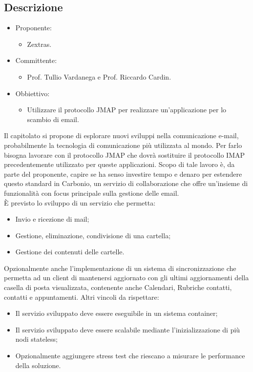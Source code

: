 \documentclass[a4paper, twoside]{article}
\begin{document}
    \subsection{Descrizione}
        \begin{itemize}
            \item Proponente:
            \begin{itemize}
                \item Zextras.
            \end{itemize}
            \item Committente:
            \begin{itemize}
                \item Prof. Tullio Vardanega e Prof.
                Riccardo Cardin.
            \end{itemize}
            \item Obbiettivo:
            \begin{itemize}
                \item Utilizzare il protocollo JMAP per realizzare un'applicazione per lo scambio di email.
            \end{itemize}
        \end{itemize}
        Il capitolato si propone di esplorare nuovi sviluppi nella comunicazione e-mail, probabilmente la tecnologia di comunicazione più utilizzata al mondo.
        Per farlo bisogna lavorare con il protocollo JMAP che dovrà sostituire il protocollo IMAP precedentemente utilizzato per queste applicazioni.
        Scopo di tale lavoro è, da parte del proponente, capire se ha senso investire tempo e denaro per estendere questo standard in Carbonio, un servizio di
        collaborazione che offre un’insieme di funzionalità con focus
        principale sulla gestione delle email.\\
        È previsto lo sviluppo di un servizio che permetta:
        \begin{itemize}
        \item Invio e ricezione di mail;
        \item Gestione, eliminazione, condivisione di una cartella;
        \item Gestione dei contenuti delle cartelle.
        \end{itemize}
        Opzionalmente anche l'implementazione di un sistema di sincronizzazione che permetta ad
        un client di mantenersi aggiornato con gli ultimi aggiornamenti della casella di posta visualizzata,
        contenente anche Calendari, Rubriche contatti, contatti e appuntamenti. Altri vincoli da rispettare:
        \begin{itemize}
        \item Il servizio sviluppato deve essere eseguibile in un sistema container;
        \item Il servizio sviluppato deve essere scalabile mediante l’inizializzazione di più nodi stateless;
        \item Opzionalmente aggiungere stress test che riescano a misurare le performance della soluzione.
        \end{itemize}
\end{document}
